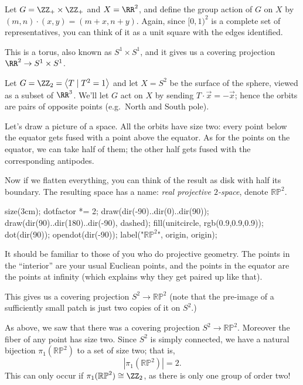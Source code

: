 \begin{example}
	Let $G = \ZZ_+ \times \ZZ_+$ and $X = \RR^2$,
	and define the group action of $G$ on $X$ by $(m,n) \cdot (x,y)
	= (m+x, n+y)$.
	Again, since $[0,1)^2$ is a complete set of representatives,
	you can think of it as a unit square with the edges identified.

	This is a torus, also known as $S^1 \times S^1$,
	and it gives us a covering projection $\RR^2 \to S^1 \times S^1$.
\end{example}

\begin{example}[$\mathbb {RP}^2$]
	Let $G = \Zc 2 = \left<T \mid T^2 = 1\right>$ and
	let $X = S^2$ be the surface of the sphere,
	viewed as a subset of $\RR^3$.
	We'll let $G$ act on $X$ by sending $T \cdot \vec x = - \vec x$;
	hence the orbits are pairs of opposite points (e.g.\ North and South pole).

	Let's draw a picture of a space.
	All the orbits have size two:
	every point below the equator gets fused with a point above the equator.
	As for the points on the equator, we can take half of them; the other half
	gets fused with the corresponding antipodes.

	Now if we flatten everything, you can think of the result as disk
	with half its boundary.
	The resulting space has a name: \emph{real projective $2$-space},
	denote $\mathbb{RP}^2$.
	\begin{center}
		\begin{asy}
			size(3cm);
			dotfactor *= 2;
			draw(dir(-90)..dir(0)..dir(90));
			draw(dir(90)..dir(180)..dir(-90), dashed);
			fill(unitcircle, rgb(0.9,0.9,0.9));
			dot(dir(90));
			opendot(dir(-90));
			label("$\mathbb{RP}^2$", origin, origin);
		\end{asy}
	\end{center}

	It should be familiar to those of you who do projective geometry.
	The points in the ``interior'' are your usual Eucliean points,
	and the points in the equator are the points at infinity
	(which explains why they get paired up like that).

	This gives us a covering projection $S^2 \to \mathbb{RP}^2$
	(note that the pre-image of a sufficiently small patch is just two copies
	of it on $S^2$.)
\end{example}
\begin{example}
	As above, we saw that there was a covering projection
	$S^2 \to \mathbb{RP}^2$.
	Moreover the fiber of any point has size two.
	Since $S^2$ is simply connected, we have a natural bijection
	$\pi_1(\mathbb{RP}^2)$ to a set of size two; that is,
	\[ \left\lvert \pi_1(\mathbb{RP}^2) \right\rvert = 2. \]
	This can only occur if $\pi_1(\mathbb{RP}^2) \cong \Zc 2$,
	as there is only one group of order two!
\end{example}

